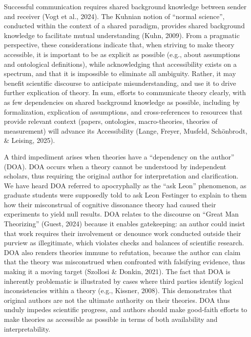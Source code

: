 \documentclass[
  man,floatsintext]{apa6}
\begin{document}
Successful communication requires shared background knowledge between sender and receiver (Vogt et al., 2024).
The Kuhnian notion of ``normal science'', conducted within the context of a shared paradigm, provides shared background knowledge to facilitate mutual understanding (Kuhn, 2009).
From a pragmatic perspective, these considerations indicate that,
when striving to make theory accessible,
it is important to be as explicit as possible (e.g., about assumptions and ontological definitions),
while acknowledging that accessibility exists on a spectrum,
and that it is impossible to eliminate all ambiguity.
Rather, it may benefit scientific discourse to anticipate misunderstanding,
and use it to drive further explication of theory.
In sum, efforts to communicate theory clearly, with as few dependencies on shared background knowledge as possible, including by formalization, explication of assumptions,
and cross-references to resources that provide relevant context (papers, ontologies, macro-theories, theories of measurement)
will advance its Accessibility (Lange, Freyer, Musfeld, Schönbrodt, \& Leising, 2025).

A third impediment arises when theories have a ``dependency on the author'' (DOA).
DOA occurs when a theory cannot be understood by independent scholars,
thus requiring the original author for interpretation and clarification.
We have heard DOA referred to apocryphally as the ``ask Leon'' phenomenon,
as graduate students were supposedly told to ask Leon Festinger to explain to them how their misconstrual of cognitive dissonance theory had caused their experiments to yield null results.
DOA relates to the discourse on ``Great Man Theorizing'' (Guest, 2024) because it enables gatekeeping: an author could insist that work requires their involvement or denounce work conducted outside their purview as illegitimate,
which violates checks and balances of scientific research.
DOA also renders theories immune to refutation,
because the author can claim that the theory was misconstrued when confronted with falsifying evidence, thus making it a moving target (Szollosi \& Donkin, 2021).
The fact that DOA is inherently problematic is illustrated by cases where third parties identify logical inconsistencies within a theory (e.g., Kissner, 2008).
This demonstrates that original authors are not the ultimate authority on their theories.
DOA thus unduly impedes scientific progress, and authors should make good-faith efforts to make theories as accessible as possible in terms of both availability and interpretability.
\end{document}
